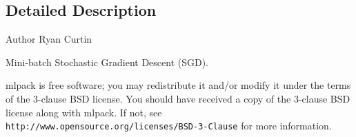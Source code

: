 \subsection{Detailed Description}
\begin{DoxyAuthor}{Author}
Ryan Curtin
\end{DoxyAuthor}
Mini-\/batch Stochastic Gradient Descent (S\+GD).

mlpack is free software; you may redistribute it and/or modify it under the terms of the 3-\/clause B\+SD license. You should have received a copy of the 3-\/clause B\+SD license along with mlpack. If not, see {\tt http\+://www.\+opensource.\+org/licenses/\+B\+S\+D-\/3-\/\+Clause} for more information. 